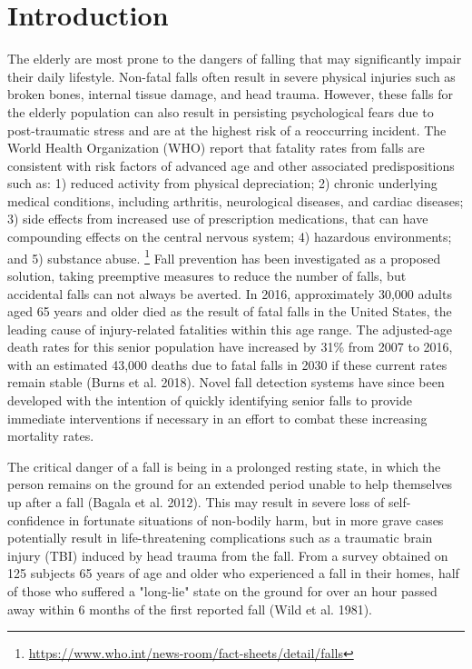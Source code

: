 \documentclass{llncs}
\begin{document}
\section{Introduction}

The elderly are most prone to the dangers of falling that may significantly impair their daily lifestyle. Non-fatal falls often result in severe physical injuries such as broken bones, internal tissue damage, and head trauma. However, these falls for the elderly population can also result in persisting psychological fears due to post-traumatic stress and are at the highest risk of a reoccurring incident. The World Health Organization (WHO) report that fatality rates from falls are consistent with risk factors of advanced age and other associated predispositions such as: 1) reduced activity from physical depreciation; 2) chronic underlying medical conditions, including arthritis, neurological diseases, and cardiac diseases; 3) side effects from increased use of prescription medications, that can have compounding effects on the central nervous system;  4) hazardous environments; and 5) substance abuse. \footnote{\url{https://www.who.int/news-room/fact-sheets/detail/falls}} Fall prevention has been investigated as a proposed solution, taking preemptive measures to reduce the number of falls, but accidental falls can not always be averted.  In 2016, approximately 30,000 adults aged 65 years and older died as the result of fatal falls in the United States, the leading cause of injury-related fatalities within this age range. The adjusted-age death rates for this senior population have increased by 31\% from 2007 to 2016, with an estimated 43,000 deaths due to fatal falls in 2030 if these current rates remain stable (Burns et al. 2018). \cite{burns2018deaths} Novel fall detection systems have since been developed with the intention of quickly identifying senior falls to provide immediate interventions if necessary in an effort to combat these increasing mortality rates.



	 The critical danger of a fall is being in a prolonged resting state, in which the person remains on the ground for an extended period unable to help themselves up after a fall (Bagala et al. 2012).\cite{bagala2012evaluation} This may result in severe loss of self-confidence in fortunate situations of non-bodily harm, but in more grave cases potentially result in life-threatening complications such as a traumatic brain injury (TBI) induced by head trauma from the fall. From a survey obtained on 125 subjects 65 years of age and older who experienced a fall in their homes, half of those who suffered a "long-lie" state on the ground for over an hour passed away within 6 months of the first reported fall (Wild et al. 1981).\cite{wild1981dangerous} 
	 
\end{document}

